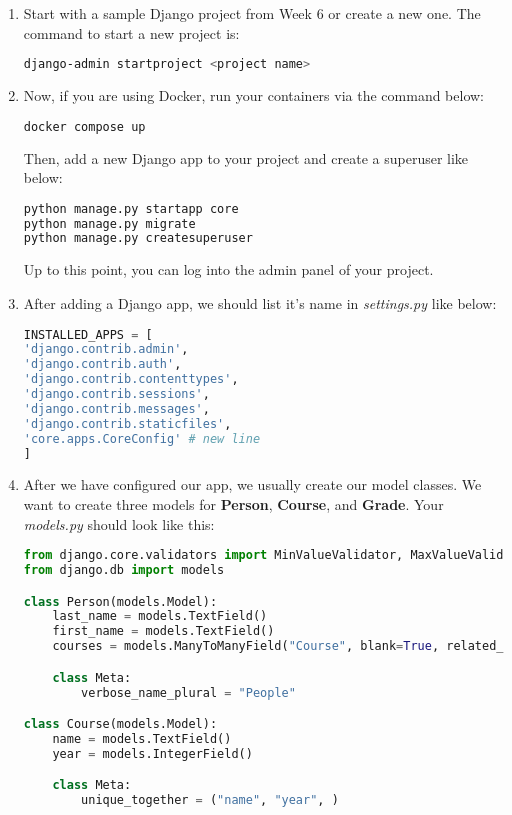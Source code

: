 \documentclass{homework}
\begin{document}
\begin{enumerate}[label=\roman*)]
    \item Start with a sample Django project from Week 6 or create a new one. The command to start a new project is:
    \begin{lstlisting}[language=bash]
django-admin startproject <project name>
\end{lstlisting}
    
    \item Now, if you are using Docker, run your containers via the command below:
    \begin{lstlisting}[language=bash]
docker compose up
\end{lstlisting}
    Then, add a new Django app to your project and create a superuser like below:
    \begin{lstlisting}[language=bash]
python manage.py startapp core
python manage.py migrate
python manage.py createsuperuser
\end{lstlisting}
    Up to this point, you can log into the admin panel of your project.
    \item After adding a Django app, we should list it's name in \textit{settings.py} like below:
    \begin{lstlisting}[language=python]
INSTALLED_APPS = [
'django.contrib.admin',
'django.contrib.auth',
'django.contrib.contenttypes',
'django.contrib.sessions',
'django.contrib.messages',
'django.contrib.staticfiles',
'core.apps.CoreConfig' # new line
]
\end{lstlisting}
\newpage
    \item After we have configured our app, we usually create our model classes. We want to create three models for \textbf{Person}, \textbf{Course}, and \textbf{Grade}.
    Your \textit{models.py} should look like this:
    \begin{lstlisting}[language=python]
from django.core.validators import MinValueValidator, MaxValueValidator
from django.db import models

class Person(models.Model):
    last_name = models.TextField()
    first_name = models.TextField()
    courses = models.ManyToManyField("Course", blank=True, related_name="students")

    class Meta:
        verbose_name_plural = "People"

class Course(models.Model):
    name = models.TextField()
    year = models.IntegerField()

    class Meta:
        unique_together = ("name", "year", )


\end{lstlisting}
\end{enumerate}
\end{document}
